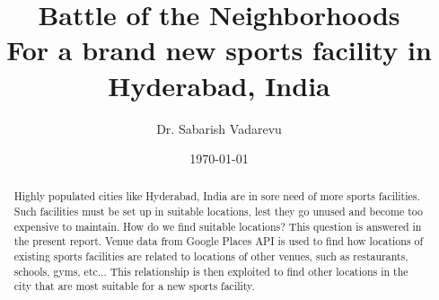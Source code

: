 \documentclass[11pt]{report}            %
\title{\bf Battle of the Neighborhoods\\
For a brand new sports facility in Hyderabad, India}  %
\author{Dr. Sabarish Vadarevu}              %
\date{\today}                           %
\begin{document}
\maketitle                              %
\setcounter{page}{2}                    %
\tableofcontents                        %






\begin{abstract}
Highly populated cities like Hyderabad, India are in sore need of more sports facilities. Such facilities must be set up in suitable locations, lest they go unused and become too expensive to maintain. How do we find suitable locations? This question is answered in the present report. Venue data from Google Places API is used to find how locations of existing sports facilities are related to locations of other venues, such as restaurants, schools, gyms, etc... This relationship is then exploited to find other locations in the city that are most suitable for a new sports facility. 
\end{abstract}












%
%

\begin{appendices}

\end{appendices}
\end{document}

